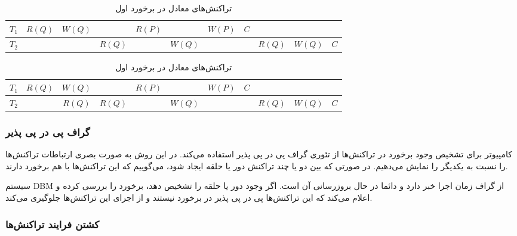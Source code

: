 \documentclass[a4paper]{article}
\begin{document}
\begin{LTR}
    \begin{table}[h]
        \centering
        \begin{RTL}
            \caption{تراکنش‌های معادل در برخورد اول}
        \end{RTL}
        \begin{tabular}{|c|c|c|c|c|c|c|c|c|c|c|}
            \hline
            $T_{1}$ & $R(Q)$ & $W(Q)$ & & $R(P)$ & & $W(P)$ & $C$ & & & \\ \hline
            $T_{2}$ & & & $R(Q)$ & & $W(Q)$ & &  & $R(Q)$ & $W(Q)$ & $C$ \\ \hline
        \end{tabular}
    \end{table}
\end{LTR}


\begin{LTR}
    \begin{table}[h]
        \centering
        \begin{RTL}
            \caption{تراکنش‌های معادل در برخورد اول}
        \end{RTL}
        \begin{tabular}{|c|c|c|c|c|c|c|c|c|c|c|}
            \hline
            $T_{1}$ & $R(Q)$ & $W(Q)$ & & $R(P)$ & & $W(P)$ & $C$ & & & \\ \hline
            $T_{2}$ & & $R(Q)$ & $R(Q)$ & & $W(Q)$ & &  & $R(Q)$ & $W(Q)$ & $C$ \\ \hline
        \end{tabular}
    \end{table}
\end{LTR}

\subsubsection{گراف پی در پی پذیر}

کامپیوتر برای تشخیص وجود برخورد در تراکنش‌ها از تئوری گراف پی در پی پذیر استفاده
می‌کند. در این روش به صورت بصری ارتباطات تراکنش‌ها را ‌نسبت به یکدیگر را نمایش
می‌دهیم. در صورتی که بین دو یا چند تراکنش دور یا حلقه ایجاد شود، می‌گوییم که این
تراکنش‌ها با هم برخورد دارند.

سیستم DBM از گراف زمان اجرا خبر دارد و دائما در حال بروزرسانی آن است. اگر وجود
دور یا حلقه را تشخیص دهد، برخورد را بررسی کرده و اعلام می‌کند که این تراکنش‌ها
پی در پی پذیر در برخورد نیستند و از اجرای این تراکنش‌ها جلوگیری می‌کند.

\subsubsection{کشتن فرایند تراکنش‌ها}
\end{document}
